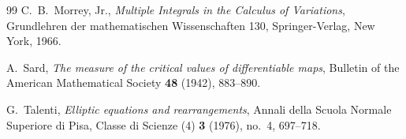 \documentclass[11pt]{article}
\theoremstyle{definition}
\begin{document}
\begin{thebibliography}{99}
 C.~B.~Morrey, Jr.,
\emph{Multiple Integrals in the Calculus of Variations}, Grundlehren der
mathematischen Wissenschaften 130, Springer-Verlag, New York, 1966.

 A.~Sard,
\emph{The measure of the critical values of differentiable maps},
Bulletin of the American Mathematical Society \textbf{48} (1942), 883--890.

 G.~Talenti,
\emph{Elliptic equations and rearrangements},
Annali della Scuola Normale Superiore di Pisa, Classe di Scienze (4)
\textbf{3} (1976), no.~4, 697--718.

\end{thebibliography}
\end{document}
